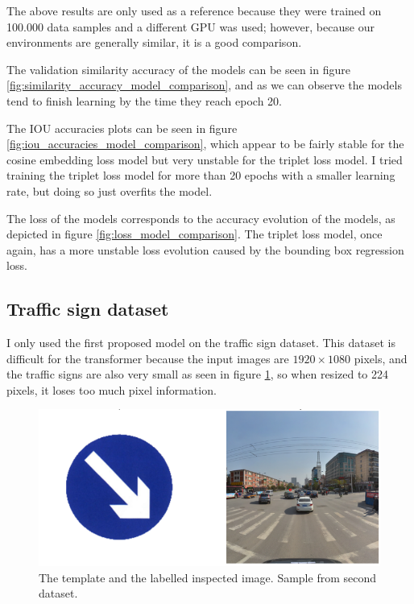 \documentclass{report}[12pt, a4paper]
\begin{document}
The above results are only used as a reference because they were trained on 100.000 data samples and a different GPU was used; however, because our environments are generally similar, it is a good comparison.

The validation similarity accuracy of the models can be seen in figure \ref{fig:similarity_accuracy_model_comparison}, and as we can observe the models tend to finish learning by the time they reach epoch 20.


The IOU accuracies plots can be seen in figure \ref{fig:iou_accuracies_model_comparison}, which appear to be fairly stable for the cosine embedding loss model but very unstable for the triplet loss model. I tried training the triplet loss model for more than 20 epochs with a smaller learning rate, but doing so just overfits the model.

The loss of the models corresponds to the accuracy evolution of the models, as depicted in figure \ref{fig:loss_model_comparison}. The triplet loss model, once again, has a more unstable loss evolution caused by the bounding box regression loss.

\subsection{Traffic sign dataset}

I only used the first proposed model on the traffic sign dataset. This dataset is difficult for the transformer because the input images are $1920\times1080$ pixels, and the traffic signs are also very small as seen in figure \ref{fig:roadsign_dataset_example}, so when resized to 224 pixels, it loses too much pixel information.

\begin{figure}[htp]
    \centering
    \includegraphics[width=12cm]{roadsign_dataset_example}
    \caption{The template and the labelled inspected image. Sample from second dataset.}
    \label{fig:roadsign_dataset_example}
\end{figure}
\end{document}
